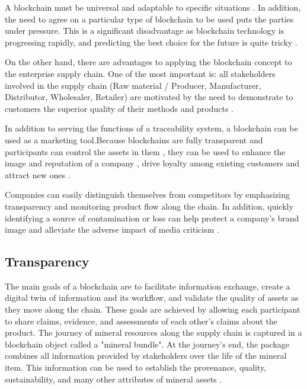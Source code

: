 A blockchain must be universal and adaptable to specific situations \cite{valenta2017comparison}. In addition, the need to agree on a particular type of blockchain to be used puts the parties under pressure. This is a significant disadvantage as blockchain technology is progressing rapidly, and predicting the best choice for the future is quite tricky \cite{galvez2018future}.

On the other hand, there are advantages to applying the blockchain concept to the enterprise supply chain. One of the most important is: all stakeholders involved in the supply chain (Raw material / Producer, Manufacturer, Distributor, Wholesaler, Retailer) are motivated by the need to demonstrate to customers the superior quality of their methods and products \cite{lu2017adaptable}. 

In addition to serving the functions of a traceability system, a blockchain can be used as a marketing tool.Because blockchains are fully transparent \cite{iansiti2017truth} and participants can control the assets in them \cite{liao2011food}, they can be used to enhance the image and reputation of a company \cite{van2007essentials}, drive loyalty among existing customers \cite{pizzuti2015global} and attract new ones \cite{svensson2009transparency}. 

Companies can easily distinguish themselves from competitors by emphasizing transparency and monitoring product flow along the chain. In addition, quickly identifying a source of contamination or loss can help protect a company's brand image \cite{mejia2010traceability} and alleviate the adverse impact of media criticism \cite{dabbene2011food}.

\subsection{Transparency}\label{sec:transparency}

The main goals of a blockchain are to facilitate information exchange, create a digital twin of information and its workflow, and validate the quality of assets as they move along the chain. These goals are achieved by allowing each participant to share claims, evidence, and assessments of each other's claims about the product. The journey of mineral resources along the supply chain is captured in a blockchain object called a "mineral bundle". At the journey's end, the package combines all information provided by stakeholders over the life of the mineral item. This information can be used to establish the provenance, quality, sustainability, and many other attributes of mineral assets \cite{martin2017technology}.

